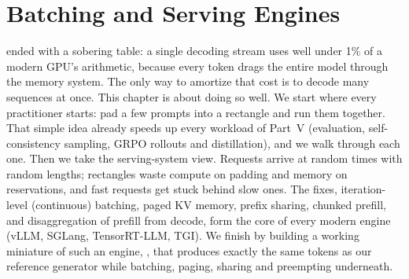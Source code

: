 \chapter{Batching and Serving Engines}\label{ch:serving}

 ended with a sobering table: a single decoding stream uses well under 1\% of a
modern GPU's arithmetic, because every token drags the entire model through the memory system.
The only way to amortize that cost is to decode many sequences at once. This chapter is about
doing so well. We start where every practitioner starts: pad a few prompts into a rectangle and
run them together. That simple idea already speeds up every workload of Part~V (evaluation,
self-consistency sampling, GRPO rollouts and distillation), and we walk through each one. Then we
take the serving-system view. Requests arrive at random times with random lengths; rectangles waste
compute on padding and memory on reservations, and fast requests get stuck behind slow ones. The
fixes, iteration-level (continuous) batching, paged KV memory, prefix sharing, chunked prefill, and
disaggregation of prefill from decode, form the core of every modern engine (vLLM, SGLang,
TensorRT-LLM, TGI). We finish by building a working miniature of such an engine,
, that produces exactly the same tokens as our reference generator while
batching, paging, sharing and preempting underneath.

